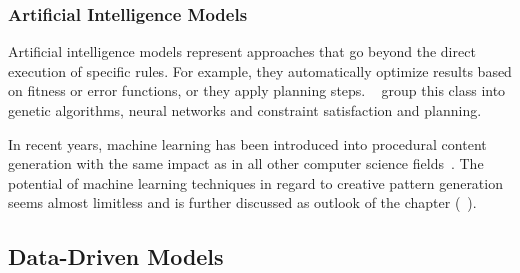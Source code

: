 \subsubsection{Artificial Intelligence Models}

Artificial intelligence models represent approaches that go beyond the direct execution of specific rules. For example, they automatically optimize results based on fitness or error functions, or they apply planning steps. \citeauthor*{hendrikx_2013_pcg}~\cite{hendrikx_2013_pcg} group this class into genetic algorithms, neural networks and constraint satisfaction and planning. 

In recent years, machine learning has been introduced into procedural content generation with the same impact as in all other computer science fields~\cite{summerville_2017_pcg}. The potential of machine learning techniques in regard to creative pattern generation seems almost limitless and is further discussed as outlook of the chapter (~). 






\subsection[Data-Driven]{Data-Driven Models}
\label{subsec:design_models_datadriven}

